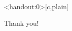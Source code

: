 \documentclass[mathserif,10pt]{beamer}
\newcommand{\inStructColor}[1]{\textcolor{MyNewDelftBlue}{#1}}
\begin{document}
\begin{appendix}
\begin{frame}<handout:0>[c,plain]
\begin{center}
{\huge\inStructColor{Thank you!}}
\end{center}
\end{frame}
%
%
%
%
%
%
%
%
\end{appendix}
\end{document}
